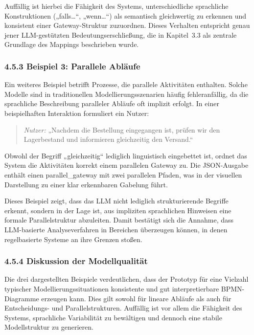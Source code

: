 \documentclass[a4paper,12pt]{scrreprt}
\begin{document}
Auffällig ist hierbei die Fähigkeit des Systems, unterschiedliche sprachliche Konstruktionen („falls…“, „wenn…“) als semantisch gleichwertig zu erkennen und konsistent einer Gateway-Struktur zuzuordnen. Dieses Verhalten entspricht genau jener LLM-gestützten Bedeutungserschließung, die in Kapitel~3.3 als zentrale Grundlage des Mappings beschrieben wurde.

\subsubsection*{4.5.3 Beispiel 3: Parallele Abläufe}

Ein weiteres Beispiel betrifft Prozesse, die parallele Aktivitäten enthalten. Solche Modelle sind in traditionellen Modellierungsszenarien häufig fehleranfällig, da die sprachliche Beschreibung paralleler Abläufe oft implizit erfolgt. In einer beispielhaften Interaktion formuliert ein Nutzer:

\begin{quote}
	\textit{Nutzer:} „Nachdem die Bestellung eingegangen ist, prüfen wir den Lagerbestand und 
	informieren gleichzeitig den Versand.“ \\
\end{quote}

Obwohl der Begriff „gleichzeitig“ lediglich linguistisch eingebettet ist, ordnet das System die Aktivitäten korrekt einem parallelen Gateway zu. Die JSON-Ausgabe enthält einen parallel\_gateway mit zwei parallelen Pfaden, was in der visuellen Darstellung zu einer klar erkennbaren Gabelung führt.

Dieses Beispiel zeigt, dass das LLM nicht lediglich strukturierende Begriffe erkennt, sondern in der Lage ist, aus impliziten sprachlichen Hinweisen eine formale Parallelstruktur abzuleiten. Damit bestätigt sich die Annahme, dass LLM-basierte Analyseverfahren in Bereichen überzeugen können, in denen regelbasierte Systeme an ihre Grenzen stoßen.

\subsubsection*{4.5.4 Diskussion der Modellqualität}

Die drei dargestellten Beispiele verdeutlichen, dass der Prototyp für eine Vielzahl typischer Modellierungssituationen konsistente und gut interpretierbare BPMN-Diagramme erzeugen kann. Dies gilt sowohl für lineare Abläufe als auch für Entscheidungs- und Parallelstrukturen. Auffällig ist vor allem die Fähigkeit des Systems, sprachliche Variabilität zu bewältigen und dennoch eine stabile Modellstruktur zu generieren. 
\end{document}
